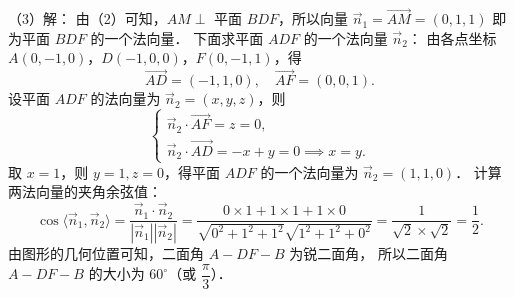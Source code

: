 \begin{answer}
（3）解：
由（2）可知，$AM \perp$ 平面 $BDF$，所以向量 $\vec{n}_1 = \vec{AM} = (0, 1, 1)$ 即为平面 $BDF$ 的一个法向量．
下面求平面 $ADF$ 的一个法向量 $\vec{n}_2$：
由各点坐标 $A(0, -1, 0)$，$D(-1, 0, 0)$，$F(0, -1, 1)$，得
\nopagebreak[4]
\[
\vec{AD} = (-1, 1, 0), \quad \vec{AF} = (0, 0, 1).
\]
设平面 $ADF$ 的法向量为 $\vec{n}_2 = (x, y, z)$，则
\nopagebreak[4]
\[
\begin{cases} \vec{n}_2 \cdot \vec{AF} = z = 0, \\ \vec{n}_2 \cdot \vec{AD} = -x + y = 0 \implies x = y. \end{cases}
\]
取 $x = 1$，则 $y = 1, z = 0$，得平面 $ADF$ 的一个法向量为 $\vec{n}_2 = (1, 1, 0)$．
计算两法向量的夹角余弦值：
\nopagebreak[4]
\[
\cos\langle \vec{n}_1, \vec{n}_2 \rangle = \frac{\vec{n}_1 \cdot \vec{n}_2}{|\vec{n}_1| |\vec{n}_2|} = \frac{0 \times 1 + 1 \times 1 + 1 \times 0}{\sqrt{0^2 + 1^2 + 1^2} \sqrt{1^2 + 1^2 + 0^2}} = \frac{1}{\sqrt{2} \times \sqrt{2}} = \frac{1}{2}.
\]
由图形的几何位置可知，二面角 $A - DF - B$ 为锐二面角，
所以二面角 $A - DF - B$ 的大小为 $60^\circ$（或 $\dfrac{\pi}{3}$）．


\end{answer}
